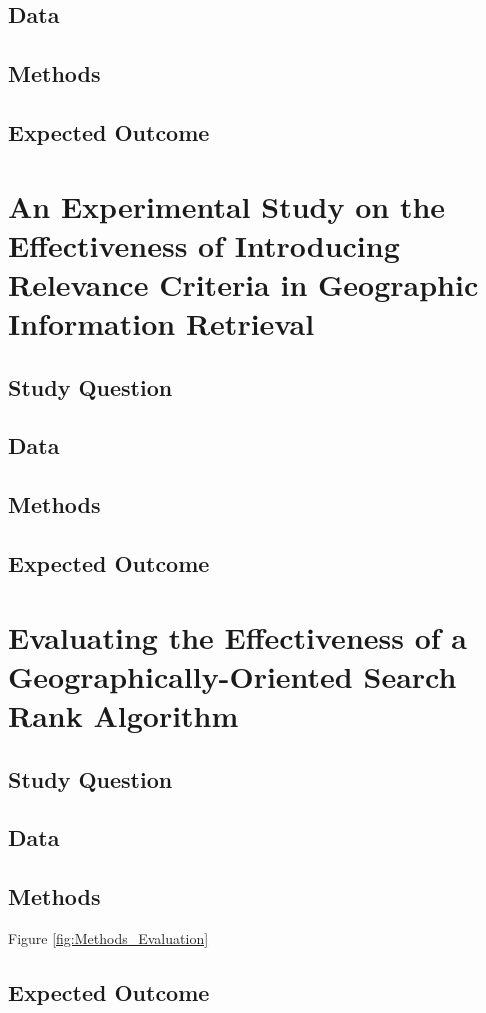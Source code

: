 \subsection{Data}
\subsection{Methods}
\subsection{Expected Outcome}

\section{An Experimental Study on the Effectiveness of Introducing Relevance Criteria in Geographic Information Retrieval}
\subsection{Study Question}
\subsection{Data}
\subsection{Methods}
\subsection{Expected Outcome}

\section{Evaluating the Effectiveness of a Geographically-Oriented Search Rank Algorithm}
\subsection{Study Question}
\subsection{Data}
\subsection{Methods}

Figure \ref{fig:Methods_Evaluation}

\subsection{Expected Outcome}

